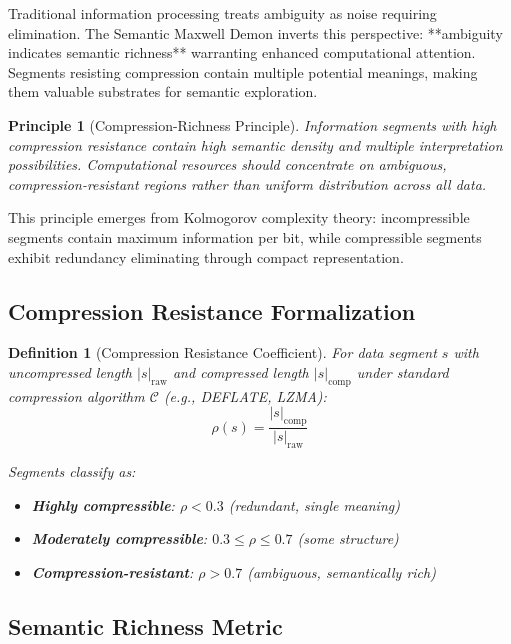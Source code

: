 \documentclass[12pt,a4paper]{article}
\newtheorem{definition}{Definition}
\newtheorem{principle}{Principle}
\begin{document}
Traditional information processing treats ambiguity as noise requiring elimination. The Semantic Maxwell Demon inverts this perspective: **ambiguity indicates semantic richness** warranting enhanced computational attention. Segments resisting compression contain multiple potential meanings, making them valuable substrates for semantic exploration.

\begin{principle}[Compression-Richness Principle]
Information segments with high compression resistance contain high semantic density and multiple interpretation possibilities. Computational resources should concentrate on ambiguous, compression-resistant regions rather than uniform distribution across all data.
\end{principle}

This principle emerges from Kolmogorov complexity theory: incompressible segments contain maximum information per bit, while compressible segments exhibit redundancy eliminating through compact representation.

\subsection{Compression Resistance Formalization}

\begin{definition}[Compression Resistance Coefficient]
For data segment $s$ with uncompressed length $|s|_{\text{raw}}$ and compressed length $|s|_{\text{comp}}$ under standard compression algorithm $\mathcal{C}$ (e.g., DEFLATE, LZMA):
\begin{equation}
\rho(s) = \frac{|s|_{\text{comp}}}{|s|_{\text{raw}}}
\end{equation}

Segments classify as:
\begin{itemize}
\item \textbf{Highly compressible}: $\rho < 0.3$ (redundant, single meaning)
\item \textbf{Moderately compressible}: $0.3 \leq \rho \leq 0.7$ (some structure)
\item \textbf{Compression-resistant}: $\rho > 0.7$ (ambiguous, semantically rich)
\end{itemize}
\end{definition}

\subsection{Semantic Richness Metric}
\end{document}

